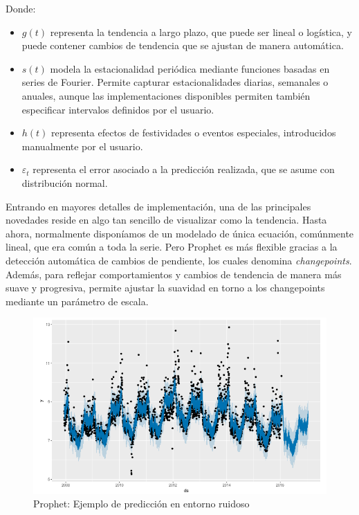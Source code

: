Donde:

\begin{itemize}
	\item \( g(t) \) representa la {tendencia a largo plazo}, que puede ser lineal o logística, y puede contener cambios de tendencia que se ajustan de manera automática.
	\item \( s(t) \) modela la {estacionalidad} periódica mediante funciones basadas en series de Fourier. Permite capturar estacionalidades diarias, semanales o anuales, aunque las implementaciones disponibles permiten también especificar intervalos definidos por el usuario.
	\item \( h(t) \) representa efectos de festividades o eventos especiales, introducidos manualmente por el usuario.
	\item \( \varepsilon_t \) representa el error asociado a la predicción realizada, que se asume con distribución normal.
\end{itemize}

Entrando en mayores detalles de implementación, una de las principales novedades reside en algo tan sencillo de visualizar como la tendencia. Hasta ahora, normalmente disponíamos de un modelado de única ecuación, comúnmente lineal, que era común a toda la serie. Pero Prophet es más flexible gracias a la detección automática de cambios de pendiente, los cuales denomina \textit{changepoints}. Además, para reflejar comportamientos y cambios de tendencia de manera más suave y progresiva, permite ajustar la suavidad en torno a los changepoints mediante un parámetro de escala.

\begin{figure}[H] %
	\centering
	\includegraphics[scale=0.375]{img/prophetex}
	\caption{Prophet: Ejemplo de predicción en entorno ruidoso  \cite{prophet2017}}
	\label{prophetex}
\end{figure}  	



